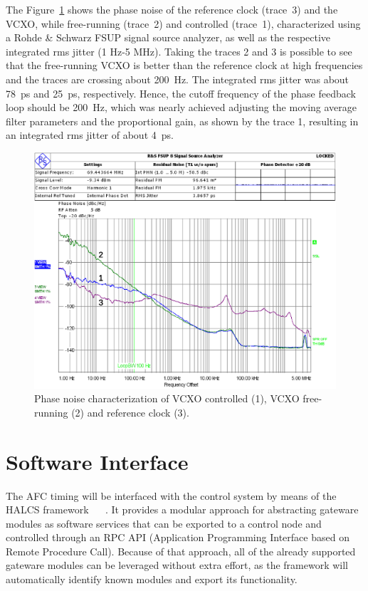 \documentclass[a4paper,
               biblatex,      %
               ]{jacow}
\begin{document}
The Figure~\ref{fig:AFCPhaseNoise} shows the phase noise of the reference clock (trace~3) and the VCXO, while free-running (trace~2) and controlled (trace~1), characterized using a Rohde \& Schwarz FSUP signal source analyzer, as well as the respective integrated rms jitter (1 Hz-5 MHz). Taking the traces 2 and 3 is possible to see that the free-running VCXO is better than the reference clock at high frequencies and the traces are crossing about 200~Hz. The integrated rms jitter was about 78~ps and 25~ps, respectively. Hence, the cutoff frequency of the phase feedback loop should be 200~Hz, which was nearly achieved adjusting the moving average filter parameters and the proportional gain, as shown by the trace 1, resulting in an integrated rms jitter of about 4~ps.

\begin{figure}[!htb]
   \centering
   \includegraphics*[width=0.9\columnwidth]{Phase_noise}
   \caption{Phase noise characterization of VCXO controlled (1), VCXO free-running (2) and reference clock (3).}
   \label{fig:AFCPhaseNoise}
\end{figure}

\section{Software Interface}
The AFC timing will be interfaced with the control system by means of the HALCS framework ~\cite{halcs_pcapac16} ~\cite{halcs_icalepcs17}. It provides a modular approach for abstracting gateware modules as software services that can be exported to a control node and controlled through an RPC API (Application Programming Interface based on Remote Procedure Call). Because of that approach, all of the already supported gateware modules can be leveraged without extra effort, as the framework will automatically identify known modules and export its functionality.
\end{document}
